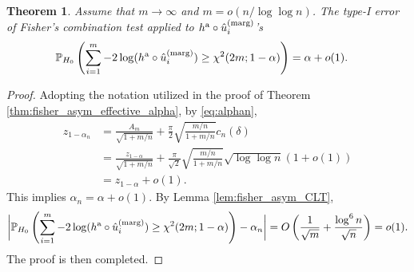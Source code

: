 \documentclass[11pt]{article}
\newtheorem{thm}{Theorem}
\def\marg{\textnormal{(marg)}}
\def\asym{\textnormal{a}}
\renewcommand{\P}{\mathbb{P}}
\newcommand{\lb}{\left(}
\newcommand{\rb}{\right)}
\begin{document}
\begin{thm}\label{thm:fisher_asym_effective_alpha_decay}
  Assume that $m \rightarrow \infty$ and $m = o(n / \log \log n)$. The type-I error of Fisher's combination test applied to $h^\asym\circ \hat{u}_i^\marg$'s
  \begin{align*}
    &\P_{H_0}\lb\sum_{i=1}^{m} -2\log(h^\asym \circ \hat{u}_i^\marg)\ge \chi^2(2m; 1 - \alpha)\rb = \alpha + o(1).
  \end{align*}
\end{thm}
\begin{proof}
  Adopting the notation utilized in the proof of Theorem \ref{thm:fisher_asym_effective_alpha}, by \eqref{eq:alphan},
  \begin{align*}
    z_{1 - \alpha_{n}} &= \frac{A_{m}}{\sqrt{1 + m/n}} + \frac{\pi}{2}\sqrt{\frac{m/n}{1 + m/n}}c_{n}(\delta)\\
                       & = \frac{z_{1-\alpha}}{\sqrt{1+m/n}} + \frac{\pi}{\sqrt{2}}\sqrt{\frac{m/n}{1 + m/n}}\sqrt{\log\log n}(1 + o(1))\\
    & = z_{1- \alpha} + o(1).
  \end{align*}
  This implies $\alpha_{n} = \alpha + o(1)$. By Lemma \ref{lem:fisher_asym_CLT},
  \[\bigg|\P_{H_0}\lb\sum_{i=1}^{m} -2\log(h^\asym \circ \hat{u}_i^\marg)\ge \chi^2(2m; 1 - \alpha)\rb - \alpha_n\bigg| = O\lb \frac{1}{\sqrt{m}} + \frac{\log^6 n}{\sqrt{n}}\rb = o(1).\]
  The proof is then completed.
\end{proof}
\end{document}
